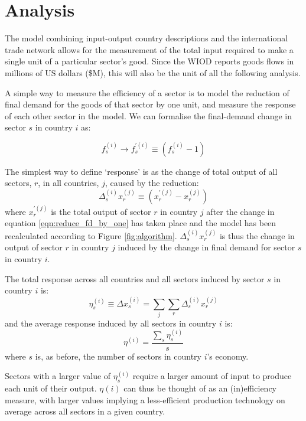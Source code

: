 \documentclass[a4paper]{article}
\begin{document}
\section{Analysis}\label{sec:analysis}
The model combining input-output country descriptions and the international trade network allows for the measurement of the total input required to make a single unit of a particular sector's good.
Since the WIOD reports goods flows in millions of US dollars (\$M), this will also be the unit of all the following analysis.

A simple way to measure the efficiency of a sector is to model the reduction of final demand for the goods of that sector by one unit, and measure the response of each other sector in the model. We can formalise the final-demand change in sector $s$ in country $i$ as:

\begin{equation}\label{eqn:reduce_fd_by_one}
f_s^{(i)} \rightarrow f_s^{\prime (i)} \equiv (f_s^{(i)} - 1)
\end{equation}

The simplest way to define `response' is as the change of total output of all sectors, $r$, in all countries, $j$, caused by the reduction:
\begin{equation}
\Delta_{s}^{(i)} x_{r}^{(j)} \equiv (x_{r}^{\prime(j)} - x_r^{(j)})
\end{equation}
where $x_{r}^{\prime(j)}$ is the total output of sector $r$ in country $j$ after the change in equation \eqref{eqn:reduce_fd_by_one} has taken place and the model has been recalculated according to Figure \ref{fig:algorithm}.
$\Delta_{s}^{(i)} x_{r}^{(j)}$ is thus the change in output of sector $r$ in country $j$ induced by the change in final demand for sector $s$ in country $i$.

The total response across all countries and all sectors induced by sector $s$ in country $i$ is:
\begin{equation}
\eta_s^{(i)} \equiv \Delta x_{s}^{(i)} = \sum_j \sum_r \Delta_{s}^{(i)} x_{r}^{(j)}
\end{equation}
and the average response induced by all sectors in country $i$ is:
\begin{equation}
\eta^{(i)} = \frac{\sum_s \eta_s^{(i)}}{s}
\end{equation}
where $s$ is, as before, the number of sectors in country $i$'s economy.

Sectors with a larger value of $\eta_s^{(i)}$ require a larger amount of input to produce each unit of their output. $\eta{(i)}$ can thus be thought of as an (in)efficiency measure, with larger values implying a less-efficient production technology on average across all sectors in a given country.
\end{document}
